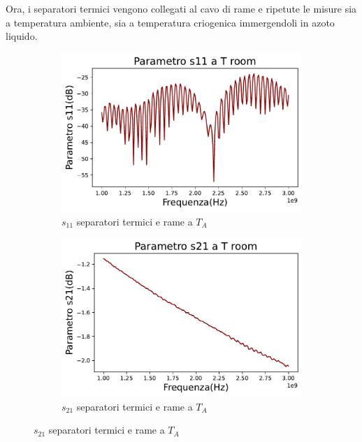 Ora, i separatori termici vengono collegati al cavo di rame e ripetute le misure sia a temperatura ambiente, sia a temperatura criogenica immergendoli in azoto liquido.

\begin{figure}[H]
\centering

\begin{subfigure}{0.49\textwidth}
	\includegraphics[width=\textwidth]{S11_TA_rame.pdf}
    \caption{$s_{11}$ separatori termici e rame a $T_{A}$}
    \label{fig:sub1}
\end{subfigure}
\hfill
\begin{subfigure}{0.49\textwidth}
    \includegraphics[width=\textwidth]{S21_TA_rame.pdf}
    \caption{$s_{21}$ separatori termici e rame a $T_{A}$}
    \label{fig:sub2}
\end{subfigure}

\end{figure}

